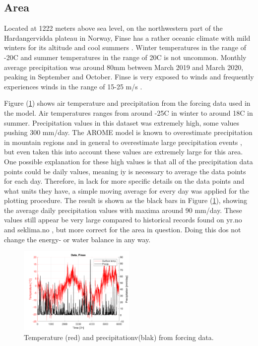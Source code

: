 \documentclass[a4paper,11pt,twocolumn]{article}
\begin{document}
\subsection{Area}
Located at 1222 meters above sea level, on the northwestern part of the Hardangervidda plateau in Norway, Finse has a rather oceanic climate with mild winters for its altitude and cool summers \cite{finse}. Winter temperatures in the range of -20\textdegree C and summer temperatures in the range of 20\textdegree C is not uncommon. Monthly average precipitation was around 80mm between March 2019 and March 2020, peaking in September and October. Finse is very exposed to winds and frequently experiences winds in the range of 15-25 m/s \cite{yr}. 

Figure (\ref{fig:forcing}) shows air temperature and precipitation from the forcing data used in the model. Air temperatures ranges from around -25\textdegree C in winter to around 18\textdegree C in summer. Precipitation values in this dataset was extremely high, some values pushing 300 mm/day. The AROME model is known to overestimate precipitation in mountain regions and in general to overestimate large precipitation events \cite{muller}, but even taken this into account these values are extremely large for this area. One possible explanation for these high values is that all of the precipitation data points could be daily values, meaning iy is necessary to average the data points for each day. Therefore, in lack for more specific details on the data points and what units they have, a simple moving average for every day was applied for the plotting procedure. The result is shown as the black bars in Figure (\ref{fig:forcing}), showing the average daily precipitation values with maxima around 90 mm/day. These values still appear be very large compared to historical records found on yr.no \cite{yr} and seklima.no \cite{seklima}, but more correct for the area in question. Doing this dos not change the energy- or water balance in any way.

\begin{figure}[h]
	\centering 
	\includegraphics[width=0.5\textwidth]{figures/precip}
	\caption{Temperature (red) and precipitationv(blak) from forcing data.}
	\label{fig:forcing}
\end{figure}
\end{document}
